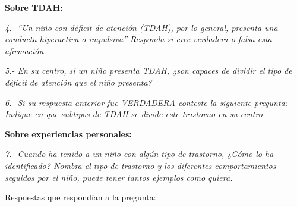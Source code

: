 \documentclass[letterpaper,12pt]{article}
\begin{document}
\begin{flushleft}
\textbf{Sobre TDAH:}
\end{flushleft}
\textit{4.- ``Un niño con déficit de atención (TDAH), por lo general, presenta una conducta hiperactiva o impulsiva'' Responda si cree verdadera o falsa esta afirmación}\\

\begin{center}
\end{center}
\textit{5.- En su centro, si un niño presenta TDAH, ¿son capaces de dividir el tipo de déficit de atención que el niño presenta?}\\

\begin{center}
\end{center}
\textit{6.- Si su respuesta anterior fue VERDADERA conteste la siguiente pregunta: Indique en que subtipos de TDAH se divide este trastorno en su centro}\\

\newpage
\begin{flushleft}
\textbf{Sobre experiencias personales:}\\
\end{flushleft}
\textit{7.- Cuando ha tenido a un niño con algún tipo de trastorno, ¿Cómo lo ha identificado? Nombra el tipo de trastorno y los diferentes comportamientos seguidos por el niño, puede tener tantos ejemplos como quiera.}

\begin{flushleft}
Respuestas que respondían a la pregunta:\\
\end{flushleft}
\end{document}
